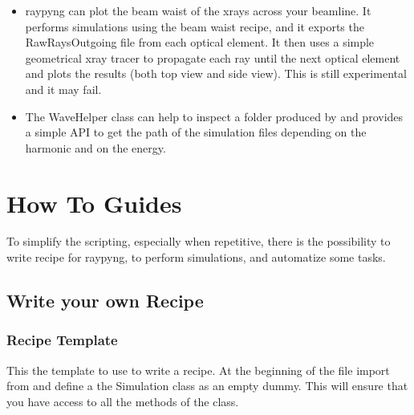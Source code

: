 \documentclass[letterpaper,10pt,english]{sphinxmanual}
\begin{document}
\begin{itemize}
\item {} 
\sphinxAtStartPar
{}
raypyng can plot the beam waist of
the x\sphinxhyphen{}rays across your beamline. It performs simulations using the beam waist recipe,
and it exports the RawRaysOutgoing file from each optical element. It then uses a
simple geometrical x\sphinxhyphen{}ray tracer to propagate each ray until the next optical
element and plots the results (both top view and side view). This is still
experimental and it may fail.

\item {} 
\sphinxAtStartPar
{}
The WaveHelper class can help to inspect a folder produced by 
and provides a simple API to get the path of the simulation files depending on the harmonic and
on the energy.

\end{itemize}

\sphinxstepscope


\chapter{How To Guides}
\label{\detokenize{how_to:how-to-guides}}\label{\detokenize{how_to::doc}}
\sphinxAtStartPar
To simplify the scripting, especially when repetitive,
there is the possibility to write recipe for raypyng, to
perform simulations, and automatize some tasks.


\section{Write your own Recipe}
\label{\detokenize{how_to:write-your-own-recipe}}

\subsection{Recipe Template}
\label{\detokenize{how_to:recipe-template}}
\sphinxAtStartPar
This the template to use to write a recipe.
At the beginning of the file import
 from 
and define a the Simulation class as an empty dummy.
This will ensure that you have access to all the methods of the
 class.
\end{document}
